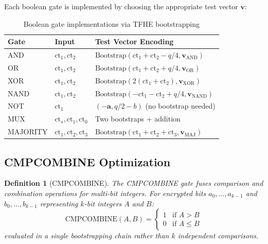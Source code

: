\documentclass[11pt,a4paper]{article}
\newtheorem{definition}{Definition}[section]
\begin{document}
Each boolean gate is implemented by choosing the appropriate test vector $\mathbf{v}$:

\begin{table}[h]
\centering
\begin{tabular}{@{}lll@{}}
\toprule
\textbf{Gate} & \textbf{Input} & \textbf{Test Vector Encoding} \\
\midrule
AND & $\text{ct}_1, \text{ct}_2$ & $\text{Bootstrap}(\text{ct}_1 + \text{ct}_2 - q/4, \mathbf{v}_{\text{AND}})$ \\
OR & $\text{ct}_1, \text{ct}_2$ & $\text{Bootstrap}(\text{ct}_1 + \text{ct}_2 + q/4, \mathbf{v}_{\text{OR}})$ \\
XOR & $\text{ct}_1, \text{ct}_2$ & $\text{Bootstrap}(2(\text{ct}_1 + \text{ct}_2), \mathbf{v}_{\text{XOR}})$ \\
NAND & $\text{ct}_1, \text{ct}_2$ & $\text{Bootstrap}(-\text{ct}_1 - \text{ct}_2 + q/4, \mathbf{v}_{\text{NAND}})$ \\
NOT & $\text{ct}_1$ & $(-\mathbf{a}, q/2 - b)$ (no bootstrap needed) \\
MUX & $\text{ct}_s, \text{ct}_1, \text{ct}_0$ & Two bootstraps + addition \\
MAJORITY & $\text{ct}_1, \text{ct}_2, \text{ct}_3$ & $\text{Bootstrap}(\text{ct}_1 + \text{ct}_2 + \text{ct}_3, \mathbf{v}_{\text{MAJ}})$ \\
\bottomrule
\end{tabular}
\caption{Boolean gate implementations via TFHE bootstrapping}
\label{tab:gates}
\end{table}

\subsection{CMPCOMBINE Optimization}

\begin{definition}[CMPCOMBINE]
The CMPCOMBINE gate fuses comparison and combination operations for multi-bit integers.
For encrypted bits $a_0, \ldots, a_{k-1}$ and $b_0, \ldots, b_{k-1}$ representing
$k$-bit integers $A$ and $B$:
\[
\text{CMPCOMBINE}(A, B) = \begin{cases}
1 & \text{if } A > B \\
0 & \text{if } A \leq B
\end{cases}
\]
evaluated in a single bootstrapping chain rather than $k$ independent comparisons.
\end{definition}
\end{document}
